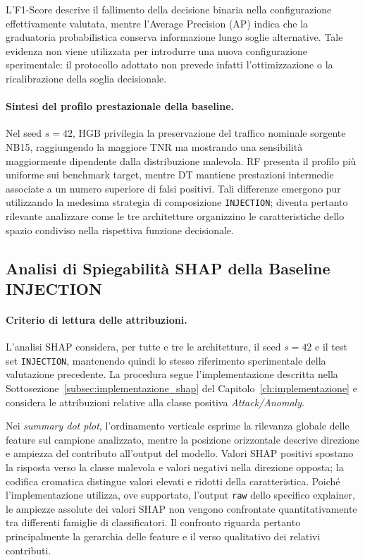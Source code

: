 L'F1-Score descrive il fallimento della decisione binaria nella configurazione effettivamente valutata, mentre l'Average Precision (AP) indica che la graduatoria probabilistica conserva informazione lungo soglie alternative. 
Tale evidenza non viene utilizzata per introdurre una nuova configurazione sperimentale: il protocollo adottato non prevede infatti l'ottimizzazione o la ricalibrazione della soglia decisionale.

\paragraph{Sintesi del profilo prestazionale della baseline.}
Nel seed $s=42$, HGB privilegia la preservazione del traffico nominale sorgente NB15, raggiungendo la maggiore TNR ma mostrando una sensibilità maggiormente dipendente dalla distribuzione malevola. 
RF presenta il profilo più uniforme sui benchmark target, mentre DT mantiene prestazioni intermedie associate a un numero superiore di falsi positivi. 
Tali differenze emergono pur utilizzando la medesima strategia di composizione \texttt{INJECTION}; diventa pertanto rilevante analizzare come le tre architetture organizzino le caratteristiche dello spazio condiviso nella rispettiva funzione decisionale.



\subsection{Analisi di Spiegabilità SHAP della Baseline INJECTION}
\label{subsec:baseline_shap}

\paragraph{Criterio di lettura delle attribuzioni.}
L'analisi SHAP considera, per tutte e tre le architetture, il seed $s=42$ e il test set \texttt{INJECTION}, mantenendo quindi lo stesso riferimento sperimentale della valutazione precedente. 
La procedura segue l'implementazione descritta nella Sottosezione~\ref{subsec:implementazione_shap} del Capitolo~\ref{ch:implementazione} e considera le attribuzioni relative alla classe positiva \textit{Attack/Anomaly}.

Nei \textit{summary dot plot}, l'ordinamento verticale esprime la rilevanza globale delle feature sul campione analizzato, mentre la posizione orizzontale descrive direzione e ampiezza del contributo all'output del modello. 
Valori SHAP positivi spostano la risposta verso la classe malevola e valori negativi nella direzione opposta; la codifica cromatica distingue valori elevati e ridotti della caratteristica. 
Poiché l'implementazione utilizza, ove supportato, l'output \texttt{raw} dello specifico explainer, le ampiezze assolute dei valori SHAP non vengono confrontate quantitativamente tra differenti famiglie di classificatori. 
Il confronto riguarda pertanto principalmente la gerarchia delle feature e il verso qualitativo dei relativi contributi.


